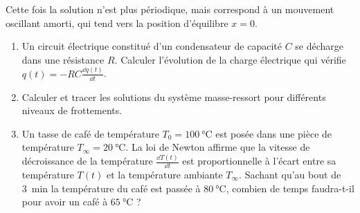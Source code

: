 \documentclass[class=report,crop=false]{standalone}
\begin{document}
Cette fois la solution n'est plus périodique, mais correspond à un mouvement
oscillant amorti, qui tend vers la position d'équilibre $x=0$.



\begin{miniexercices}
\sauteligne
\begin{enumerate}
  \item Un circuit électrique constitué d'un condensateur
  de capacité $C$ se décharge dans une résistance $R$.
  Calculer l'évolution de la charge électrique qui vérifie
  $q(t) = -RC \frac{\dd q(t)}{\dd t}$.

  \item Calculer et tracer les solutions du système masse-ressort
  pour différents niveaux de frottements.

  \item Un tasse de café de température $T_0= \SI{100}{\celsius}$
  est posée dans une pièce de température $T_\infty = \SI{20}{\celsius}$.
  La loi de Newton affirme que la vitesse de décroissance de la température
  $\frac{\dd T(t)}{\dd t}$ est proportionnelle à l'écart entre sa température
  $T(t)$ et la température ambiante $T_\infty$.
  Sachant qu'au bout de \SI{3}{\minute} la température du café
  est passée à $\SI{80}{\celsius}$, combien de temps faudra-t-il
  pour avoir un café à $\SI{65}{\celsius}$ ?
\end{enumerate}
\end{miniexercices}



\finchapitre
\end{document}
